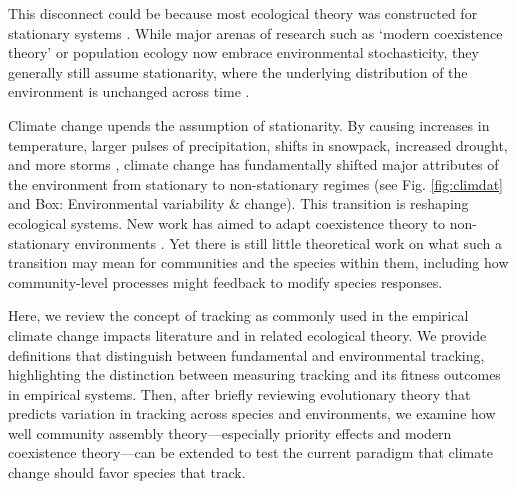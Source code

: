 \documentclass[11pt,letterpaper]{article}
\newcommand{\R}[1]{\label{}\linelabel{#1}} %
\begin{document}
This disconnect could be because most ecological theory was constructed for stationary systems \citep[e.g.,][]{Chesson:1997dz}. While major arenas of research such as `modern coexistence theory' or population ecology now embrace environmental stochasticity, they generally still assume stationarity, where the underlying distribution of the environment is unchanged across time \citep[i.e., constant mean and variance,][]{barabas2018}.

Climate change upends the assumption of stationarity. By causing increases in temperature, larger pulses of precipitation, shifts in snowpack, increased drought, and more storms \citep{ipcc2013}, climate change has fundamentally shifted major attributes of the environment from stationary to non-stationary regimes (see Fig. \ref{fig:climdat} and Box: Environmental variability \& change). This transition is reshaping ecological systems. New work has aimed to adapt coexistence theory to non-stationary environments \citep{chessonnonstat,volkerass}. Yet there is still little theoretical work on what such a transition may mean for communities and the species within them, including how community-level processes might feedback to modify species responses.

\R{aimS}Here, we review the concept of tracking as commonly used in the empirical climate change impacts literature and in related ecological theory. We provide definitions that distinguish between fundamental and environmental tracking, highlighting the distinction between measuring tracking and its fitness outcomes in empirical systems. Then, after briefly reviewing evolutionary theory that predicts variation in tracking across species and environments, we examine how well community assembly theory---especially priority effects and modern coexistence theory---\R{r3misc4}can be extended to test the current paradigm that climate change should favor species that track. \R{aimE} 
\end{document}
